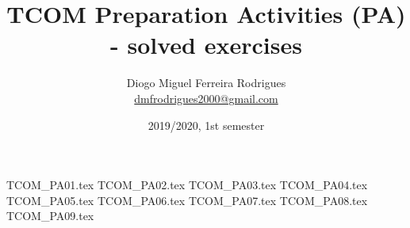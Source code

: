 \documentclass{tcom}
\title{TCOM Preparation Activities (PA) - solved exercises}
\author{Diogo Miguel Ferreira Rodrigues \\ \href{mailto:dmfrodrigues2000@gmail.com}{dmfrodrigues2000@gmail.com}}
\date{2019/2020, 1st semester}
\begin{document}
\begingroup
	\maketitle
	\let\clearpage\relax
	\setcounter{tocdepth}{2}
	\tableofcontents
\endgroup
{TCOM_PA01.tex}
{TCOM_PA02.tex}
{TCOM_PA03.tex}
{TCOM_PA04.tex}
{TCOM_PA05.tex}
{TCOM_PA06.tex}
{TCOM_PA07.tex}
{TCOM_PA08.tex}
{TCOM_PA09.tex}
\end{document}
